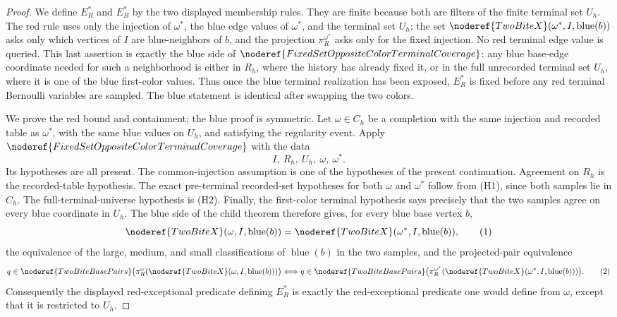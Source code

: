 \begin{proof}
We define \(E_R^\ast\) and \(E_B^\ast\) by the two displayed membership
rules.  They are finite because both are filters of the finite terminal set
\(U_h\).  The red rule uses only the injection of \(\omega^\ast\), the blue
edge values of \(\omega^\ast\), and the terminal set \(U_h\): the set
\(\noderef{TwoBiteX}(\omega^\ast,I,\operatorname{blue}(b))\) asks only
which vertices of \(I\) are blue-neighbors of \(b\), and the projection
\(\pi_R^{\omega^\ast}\) asks only for the fixed injection.  No red terminal
edge value is queried.  This last assertion is exactly the blue side of
\(\noderef{FixedSetOppositeColorTerminalCoverage}\): any blue base-edge
coordinate needed for such a neighborhood is either in \(R_h\), where the
history has already fixed it, or in the full unrecorded terminal set \(U_h\),
where it is one of the blue first-color values.  Thus once the blue terminal
realization has been exposed, \(E_R^\ast\) is fixed before any red terminal
Bernoulli variables are sampled.  The blue statement is identical after
swapping the two colors.

We prove the red bound and containment; the blue proof is symmetric.  Let
\(\omega\in C_h\) be a completion with the same injection and recorded table
as \(\omega^\ast\), with the same blue values on \(U_h\), and satisfying the
regularity event.  Apply
\(\noderef{FixedSetOppositeColorTerminalCoverage}\) with the data
\[
I,\ R_h,\ U_h,\ \omega,\ \omega^\ast .
\]
Its hypotheses are all present.  The common-injection assumption is one of
the hypotheses of the present continuation.  Agreement on \(R_h\) is the
recorded-table hypothesis.  The exact pre-terminal recorded-set hypotheses
for both \(\omega\) and \(\omega^\ast\) follow from (H1), since both samples
lie in \(C_h\).  The full-terminal-universe hypothesis is (H2).  Finally,
the first-color terminal hypothesis says precisely that the two samples agree
on every blue coordinate in \(U_h\).  The blue side of the child theorem
therefore gives, for every blue base vertex \(b\),
\[
\noderef{TwoBiteX}(\omega,I,\operatorname{blue}(b))
=
\noderef{TwoBiteX}(\omega^\ast,I,\operatorname{blue}(b)), \tag{1}
\]
the equivalence of the large, medium, and small classifications of
\(\operatorname{blue}(b)\) in the two samples, and the projected-pair
equivalence
\[
q\in\noderef{TwoBiteBasePairs}
\bigl(\pi_R^\omega
(\noderef{TwoBiteX}(\omega,I,\operatorname{blue}(b)))\bigr)
\Longleftrightarrow
q\in\noderef{TwoBiteBasePairs}
\bigl(\pi_R^{\omega^\ast}
(\noderef{TwoBiteX}(\omega^\ast,I,\operatorname{blue}(b)))\bigr).
\tag{2}
\]
Consequently the displayed red-exceptional predicate defining \(E_R^\ast\)
is exactly the red-exceptional predicate one would define from \(\omega\),
except that it is restricted to \(U_h\).


\end{proof}
